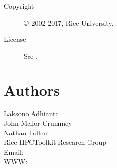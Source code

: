 \documentclass[english]{article}
\begin{document}
\begin{description}
\item[Copyright] \copyright\ 2002-2017, Rice University.
\item[License] See .
\end{description}

\section{Authors}

\noindent
Laksono Adhianto \\
John Mellor-Crummey \\
Nathan Tallent \\
Rice HPCToolkit Research Group \\
Email:  \\
WWW: .

\LatexManEnd
\end{document}
